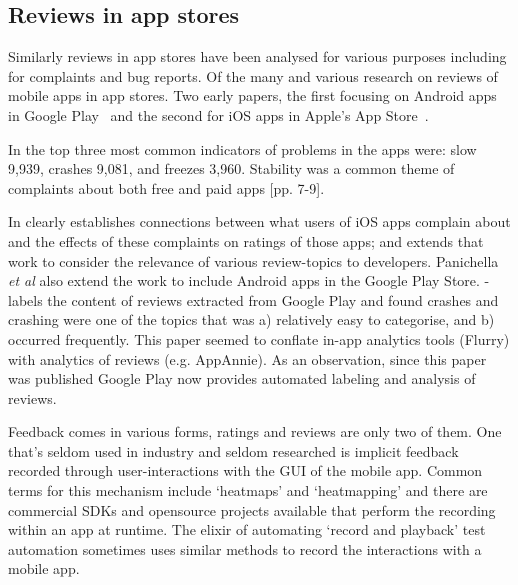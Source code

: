 \subsection{Reviews in app stores}
Similarly reviews in app stores have been analysed for various purposes including for complaints and bug reports. Of the many and various research on reviews of mobile apps in app stores. 
Two early papers, the first focusing on Android apps in Google Play~\textcite{fu2013_why_people_hate_your_app_making_sense_of_user_feedback_in_a_mobile_app_store} and the second for iOS apps in Apple's App Store~\textcite{khalid2015_what_do_mobile_app_users_complain_about}.

In \textcite[p. 5][]{fu2013_why_people_hate_your_app_making_sense_of_user_feedback_in_a_mobile_app_store} the top three most common indicators of problems in the apps were: slow 9,939, crashes 9,081, and freezes 3,960. Stability was a common theme of complaints about both free and paid apps [pp. 7-9]. 

In \textcite{khalid2015_what_do_mobile_app_users_complain_about} clearly establishes connections between what users of iOS apps complain about and the effects of these complaints on ratings of those apps; and \textcite{panichella2015_how_can_i_improve_my_app_classifying_user_reviews_for_sw_maintenance_and_evolution} extends that work to consider the relevance of various review-topics to developers. Panichella \emph{et al} also extend the work to include Android apps in the Google Play Store. \textcite{mcilroy2016_analyzing_and_automatically_labelling_the_types_of_user_issues_raised_in_mobile_app_reviews} - labels the content of reviews extracted from Google Play and found crashes and crashing were one of the topics that was a) relatively easy to categorise, and b) occurred frequently. This paper seemed to conflate in-app analytics tools (Flurry) with analytics of reviews (e.g. AppAnnie). As an observation, since this paper was published Google Play now provides automated labeling and analysis of reviews.

Feedback comes in various forms, ratings and reviews are only two of them.  One that's seldom used in industry and seldom researched is implicit feedback recorded through user-interactions with the GUI of the mobile app. Common terms for this mechanism include `heatmaps' and `heatmapping' and there are commercial SDKs and opensource projects available that perform the recording within an app at runtime. The elixir of automating `record and playback' test automation sometimes uses similar methods to record the interactions with a mobile app. 

